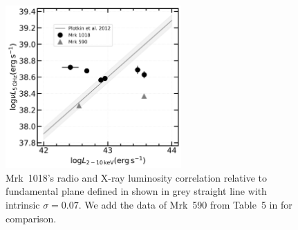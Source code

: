 \documentclass[twocolumn]{aastex63}
\begin{document}
\begin{figure}
\centering
	\includegraphics[width=0.6\textwidth]{./pic/Mrk1018_Mrk590_radio_xray_Plotkin2012_Lx.png}
    \caption{Mrk~1018's radio and X-ray luminosity correlation relative to fundamental plane defined in \citet{2012MNRAS.419..267P} shown in grey straight line with intrinsic $\sigma=0.07$. We add the data of Mrk~590 from Table~5 in \citet{2016MNRAS.460..304K} for comparison.} 
    \label{fig:radio-xray-mass_relation_Plotkin2012}
\end{figure}



%





\end{document}
